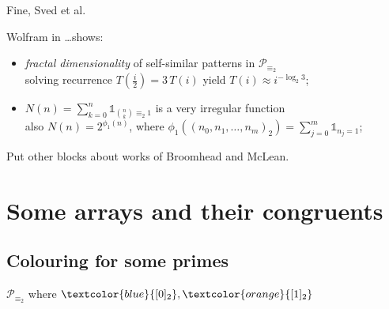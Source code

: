 \documentclass[10pt,serif, professionalfont]{beamer}
\begin{document}
\begin{frame}{Fine, Sved et al.}
    \begin{block}{Wolfram in \ldots shows:}
        \begin{itemize}
            \item {\normalsize \emph{fractal dimensionality} of self-similar patterns in $\mathcal{P}_{\equiv_{2}}$}\\
                \footnotesize{solving recurrence $T(\frac{i}{2})=3\,T(i)$ yield $T(i)\approx i^{-\log_{2}{3}}$};
            \item {\normalsize $N(n)=\sum_{k=0}^{n}{\mathbb{1}_{{{n}\choose{k}}\equiv_{2}1}}$ is a very irregular function }\\
                \footnotesize{also $N(n)=2^{\phi_{1}(n)}$, where $ \phi_{1}((n_{0},n_{1},\ldots,n_{m})_{2})=
                    \sum_{j=0}^{m}{\mathbb{1}_{n_{j}=1} }$};
        \end{itemize}
    \end{block}

    Put other blocks about works of Broomhead and McLean.
\end{frame}

\section{Some arrays and their congruents}

\subsection{Colouring for some primes}


\begin{frame}{$\mathcal{P}_{\equiv_{2}}$ where 
    $\textcolor{blue}{[0]_{2}},\textcolor{orange}{[1]_{2}}$}

    
\end{frame}
\end{document}

